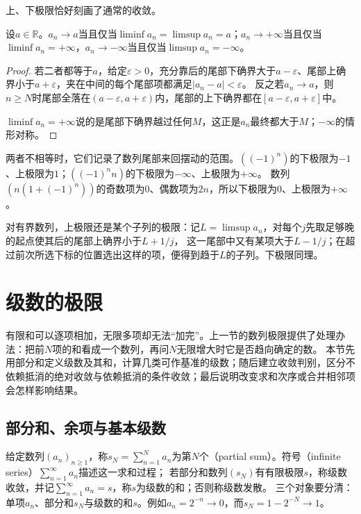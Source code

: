 上、下极限恰好刻画了通常的收敛。
\begin{theorem}[上下极限与收敛]
\label{thm:ru-limsup-convergence}
设$a\in\mathbb R$。$a_n\to a$当且仅当$\liminf a_n=\limsup a_n=a$；$a_n\to+\infty$当且仅当$\liminf a_n=+\infty$，$a_n\to-\infty$当且仅当$\limsup a_n=-\infty$。
\end{theorem}
\begin{proof}
若二者都等于$a$，给定$\varepsilon>0$，充分靠后的尾部下确界大于$a-\varepsilon$、尾部上确界小于$a+\varepsilon$，夹在中间的每个尾部项都满足$|a_n-a|<\varepsilon$。
反之若$a_n\to a$，则$n\geq N$时尾部全落在$(a-\varepsilon,a+\varepsilon)$内，尾部的上下确界都在$[a-\varepsilon,a+\varepsilon]$中。

$\liminf a_n=+\infty$说的是尾部下确界越过任何$M$，这正是$a_n$最终都大于$M$；$-\infty$的情形对称。
\end{proof}

两者不相等时，它们记录了数列尾部来回摆动的范围。$((-1)^n)$的下极限为$-1$、上极限为$1$；$((-1)^nn)$的下极限为$-\infty$、上极限为$+\infty$。
数列$(n(1+(-1)^n))$的奇数项为$0$、偶数项为$2n$，所以下极限为$0$、上极限为$+\infty$。

对有界数列，上极限还是某个子列的极限：记$L=\limsup a_n$，对每个$j$先取足够晚的起点使其后的尾部上确界小于$L+1/j$，
这一尾部中又有某项大于$L-1/j$；在超过前次所选下标的位置选出这样的项，便得到趋于$L$的子列。下极限同理。
\section{级数的极限}
\label{sec:ru-series}
\label{sec:analysis-series}

有限和可以逐项相加，无限多项却无法“加完”。上一节的数列极限提供了处理办法：把前$N$项的和看成一个数列，再问$N$无限增大时它是否趋向确定的数。
本节先用部分和定义级数及其和，计算几类可作基准的级数；随后建立收敛判别，区分不依赖抵消的绝对收敛与依赖抵消的条件收敛；最后说明改变求和次序或合并相邻项会怎样影响结果。

\subsection{部分和、余项与基本级数}
\label{sec:ru-partial-sums}
\label{sec:analysis-series-definition}

给定数列$(a_n)_{n\geq1}$，称$s_N=\sum_{n=1}^Na_n$为第$N$个（partial sum）。符号（infinite series）$\sum_{n=1}^\infty a_n$描述这一求和过程；
若部分和数列$(s_N)$有有限极限$s$，称级数收敛，并记$\sum_{n=1}^\infty a_n=s$，称$s$为级数的和；否则称级数发散。
三个对象要分清：单项$a_n$、部分和$s_N$与级数的和$s$。例如$a_n=2^{-n}\to0$，而$s_N=1-2^{-N}\to1$。

